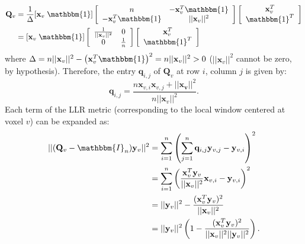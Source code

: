 \begin{align*}
    \mathbf{Q}_{v} &= \frac{1}{\Delta}
    [\mathbf{x}_{v} \; \mathbbm{1}]
    \left[\begin{array}{cc}
        n & - \mathbf{x}_{v}^{T}\mathbbm{1}\\
        -\mathbf{x}_{v}^{T}\mathbbm{1} & ||\mathbf{x}_{v}||^{2}
    \end{array}\right]
    \left[\begin{array}{c}
        \mathbf{x}_{v}^{T}\\
        \mathbbm{1}^{T}
    \end{array}\right] \\
    &= [\mathbf{x}_{v} \; \mathbbm{1}]
    \left[\begin{array}{cc}
        \frac{1}{||\mathbf{x}_{v}||^{2}} & 0\\
        0 & \frac{1}{n}
    \end{array}\right]
    \left[\begin{array}{c}
        \mathbf{x}_{v}^{T}\\
        \mathbbm{1}^{T}
    \end{array}\right]
\end{align*}
where $\Delta = n||\mathbf{x}_{v}||^{2} - \left(\mathbf{x}_{v}^{T}\mathbbm{1}\right)^{2} = n||\mathbf{x}_{v}||^{2} > 0$ ($||\mathbf{x}_{v}||^{2}$ cannot be zero, by hypothesis). Therefore, the entry $\mathbf{q}_{i,j}$ of $\mathbf{Q}_v$ at row $i$, column $j$ is given by:
\begin{displaymath}
    \mathbf{q}_{i,j} = \frac{n\mathbf{x}_{v,i}\mathbf{x}_{v,j} + ||\mathbf{x_v}||^{2}}{n||\mathbf{x}_{v}||^{2}}.
\end{displaymath}
Each term of the LLR metric (corresponding to the local window centered at voxel $v$) can be expanded as:
\begin{equation}\label{eq:llr_cc_relationship}
    \begin{split}
        ||(\mathbf{Q}_{v} - \mathbbm{I}_{n})\mathbf{y}_{v}||^{2} &= \sum_{i=1}^{n} \left(\sum_{j=1}^{n} \mathbf{q}_{i,j} \mathbf{y}_{v,j} - \mathbf{y}_{v,i}\right)^{2}\\
        &=\sum_{i=1}^{n}\left(\frac{\mathbf{x}_{v}^{T}\mathbf{y}_{v}}{||\mathbf{x}_{v}||^{2}} \mathbf{x}_{v,i} - \mathbf{y}_{v,i}\right)^{2} \\
        &=||\mathbf{y}_{v}||^{2} - \frac{(\mathbf{x}_{v}^{T}\mathbf{y}_{v})^{2}}{||\mathbf{x}_{v}||^{2}}\\
        &= ||\mathbf{y}_{v}||^{2}\left(1 - \frac{(\mathbf{x}_{v}^{T}\mathbf{y}_{v})^{2}}{||\mathbf{x}_{v}||^{2}||\mathbf{y}_{v}||^{2}}\right).
    \end{split}
\end{equation}
